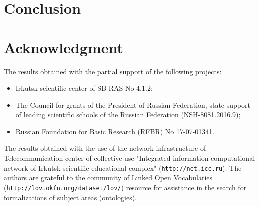 \documentclass[conference,a4paper]{IEEEtran}
\providecommand\url[1]{\texttt{#1}}
\begin{document}




\section{Conclusion}







\section*{Acknowledgment}

The results obtained with the partial support of the following projects:
\begin{itemize}
\item Irkutsk scientific center of SB RAS No 4.1.2;
\item The Council for grants of the President of Russian Federation, state support of leading scientific schools of the Russian Federation (NSH-8081.2016.9);
\item Russian Foundation for Basic Research (RFBR) No 17-07-01341.

  \end{itemize}
The results obtained with the use of the network infrastructure of Telecommunication center of collective use "Integrated information-computational network of Irkutsk scientific-educational complex" (\url{http://net.icc.ru}). The authors are grateful to the community of Linked Open Vocabularies (\url{http://lov.okfn.org/dataset/lov/}) resource for assistance in the search for formalizations of subject areas (ontologies).


\end{document}
